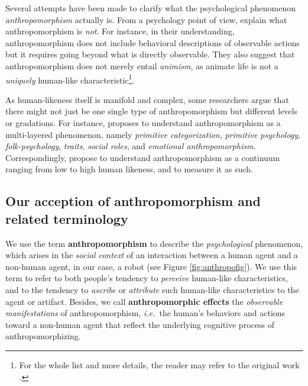 \documentclass{frontiersSCNS} %
\newcommand{\ie}{{\textit{i.e.~}}}
\begin{document}
Several attempts have been made to clarify what the psychological phenomenon
\emph{anthropomorphism} actually is.  From a psychology point of view,
\citet{epley_when_2008} explain what anthropomorphism is \textit{not}. For
instance, in their understanding, anthropomorphism does not include behavioral
descriptions of observable actions but it requires going beyond what is directly
observable. They also suggest that anthropomorphism does not merely entail
\textit{animism}, as animate life is not a \textit{uniquely} human-like
characteristic\footnote{For the whole list and more details, the reader may
refer to the original work \citep{epley_when_2008}.}.




As human-likeness itself is manifold and complex,
some researchers argue that there might not just be one single type of
anthropomorphism but different levels or gradations. For instance,
\citet{persson_anthropomorphism_2000} proposes to understand anthropomorphism as
a multi-layered phenomenon, namely \emph{primitive categorization},
\emph{primitive psychology}, \emph{folk-psychology}, \emph{traits}, \emph{social
roles}, and \emph{emotional anthropomorphism}. Correspondingly,
\citet{ruijten_introducing_2014} propose to understand anthropomorphism as a
continuum ranging from low to high human likeness, and to measure it as such.


\subsection{Our acception of anthropomorphism and related terminology}

We use the term \textbf{anthropomorphism} to describe the \emph{psychological}
phenomenon, which arises in the \emph{social context} of an interaction between
a human agent and a non-human agent, in our case, a robot (see Figure
\ref{fig:anthropofig}). We use this term to refer to both people's tendency to
\textit{perceive} human-like characteristics, and to the tendency to
\textit{ascribe} or \textit{attribute} such human-like characteristics to the
agent or artifact. Besides, we call {\bf anthropomorphic effects} the
\emph{observable manifestations} of anthropomorphism, \ie the human's behaviors
and actions toward a non-human agent that reflect the underlying cognitive
process of anthropomorphizing.
\end{document}
